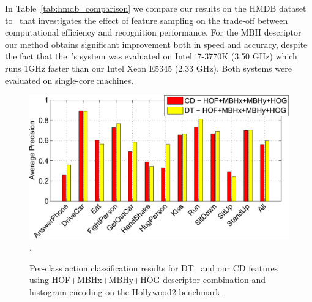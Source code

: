 \documentclass[10pt,twocolumn,letterpaper]{article}
\begin{document}
In Table~\ref{tab:hmdb_comparison} we compare our results on the HMDB dataset to~\cite{Feng13} that investigates the effect of feature sampling on the trade-off between computational efficiency and recognition performance. For the MBH descriptor our method obtains significant improvement both in speed and accuracy, despite the fact that the~\cite{Feng13}'s system was evaluated on Intel i7-3770K (3.50 GHz) which runs 1GHz faster than our Intel Xeon E5345 (2.33 GHz). Both systems were evaluated on single-core machines.



\begin{figure}
\begin{center}
\includegraphics[width=.9\linewidth]{figures/hollywood2-per-class-barplot-crop.pdf}.
\caption{Per-class action classification results for DT~\cite{Wang12} and our  CD features using HOF+MBHx+MBHy+HOG descriptor combination and histogram encoding on the Hollywood2 benchmark.\vspace{-.1cm}}
\label{fig:hwd2-barplot}
\end{center}
\end{figure}
\end{document}

